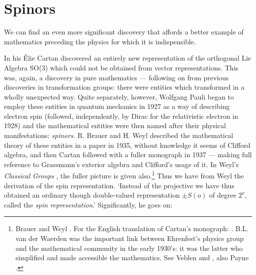 \documentclass[11pt,oneside,a4paper]{article}
\begin{document}
\section{Spinors}

We can find an even more significant discovery that affords a better example of mathematics preceding the physics for which it is indispensible.

In his \parencite*{cartan_les_1913} Élie Cartan discovered an entirely new representation of the orthogonal Lie Algebra SO(3) which could not be obtained from vector representations. This was, again, a discovery in pure mathematics --- following on from previous discoveries in transformation groups: there were entities which transformed in a wholly unexpected way. Quite separately, however, Wolfgang Pauli began to employ these entities in quantum mechanics in 1927 as a way of describing electron spin (followed, independently, by Dirac for the relativistic electron in 1928) and the mathematical entities were then named after their physical manifestations: \textit{spinors}. R. Brauer and H. Weyl described the mathematical theory of these entities in a paper in 1935, without knowledge it seems of Clifford algebra, and then Cartan followed with a fuller monograph in 1937 --- making full reference to Grassmann's exterior algebra and Clifford's usage of it. In Weyl's \textit{Classical Groups} \parencite*{weyl_classical_1939}, the fuller picture is given also.\footnote{Brauer and Weyl \parencite*[425--449]{brauer_spinors_1935}. For the English translation of Cartan's monograph: \parencite{cartan_theory_1966}. B.L. van der Waerden was the important link between Ehrenfest's physics group and the mathematical community in the early 1930's: it was the latter who simplified and made accessible the mathematics. See Veblen \parencite*{veblen_geometry_1933} and \parencite*{veblen_spinors_1934}, also Payne \parencite*{payne_elementary_1952}.}
Thus we have from Weyl \parencite*{weyl_classical_1939} the derivation of the spin representation. `Instead of the projective we have thus obtained an ordinary though double-valued representation $ \pm S (o)$ of degree $2^{\nu}$, called the \textit{spin representation}.' Significantly, he goes on:  %
\end{document}
